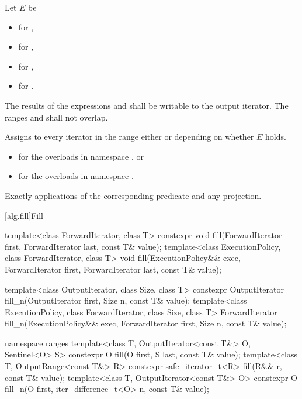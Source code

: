 \begin{itemdescr}
\setlength{\emergencystretch}{1.5em}
\pnum
Let $E$ be
\begin{itemize}
\item {}
  for ,
\item {}
  for ,
\item {}
  for ,
\item {}
  for .
\end{itemize}

\pnum
\requires
The results of the expressions  and 
shall be writable
to the  output iterator.
The ranges  and 
shall not overlap.

\pnum
\effects
Assigns to every iterator 
in the range 
either  or 
depending on whether $E$ holds.

\pnum
\returns
\begin{itemize}
\item
  for the overloads in namespace , or
\item
  for the overloads in namespace .
\end{itemize}

\pnum
\complexity
Exactly  applications
of the corresponding predicate and any projection.
\end{itemdescr}

[alg.fill]{Fill}

%
%
\begin{itemdecl}
template<class ForwardIterator, class T>
  constexpr void fill(ForwardIterator first, ForwardIterator last, const T& value);
template<class ExecutionPolicy, class ForwardIterator, class T>
  void fill(ExecutionPolicy&& exec,
            ForwardIterator first, ForwardIterator last, const T& value);

template<class OutputIterator, class Size, class T>
  constexpr OutputIterator fill_n(OutputIterator first, Size n, const T& value);
template<class ExecutionPolicy, class ForwardIterator, class Size, class T>
  ForwardIterator fill_n(ExecutionPolicy&& exec,
                         ForwardIterator first, Size n, const T& value);


namespace ranges {
  template<class T, OutputIterator<const T&> O, Sentinel<O> S>
    constexpr O fill(O first, S last, const T& value);
  template<class T, OutputRange<const T&> R>
    constexpr safe_iterator_t<R> fill(R&& r, const T& value);
  template<class T, OutputIterator<const T&> O>
    constexpr O fill_n(O first, iter_difference_t<O> n, const T& value);
}
\end{itemdecl}

